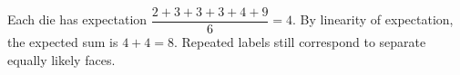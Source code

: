 Each die has expectation $\dfrac{2+3+3+3+4+9}{6}=4$. By linearity of expectation, the expected sum is $4+4=\boxed8$. Repeated labels still correspond to separate equally likely faces.
